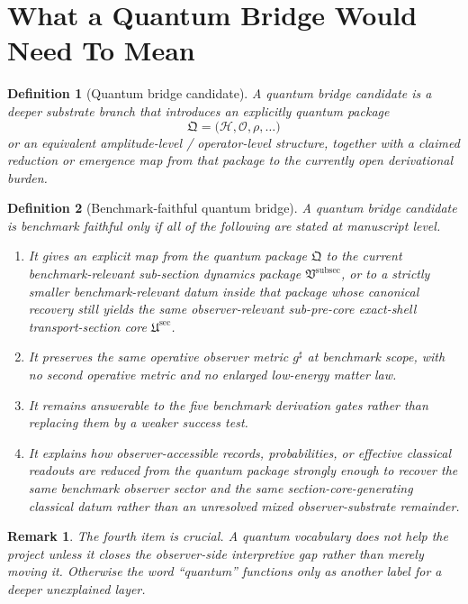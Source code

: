 \documentclass[11pt]{article}
\newcommand{\CompletedMetric}{g^{\sharp}}
\newcommand{\SubPreSectionCore}{\mathfrak U^{\mathrm{sec}}}
\newcommand{\SubSectionPackage}{\mathfrak V^{\mathrm{subsec}}}
\newcommand{\QuantumPackage}{\mathfrak Q}
\newcommand{\HilbertSpaceQ}{\mathcal H}
\newtheorem{definition}{Definition}
\newtheorem{remark}{Remark}
\begin{document}
\section{What a Quantum Bridge Would Need To Mean}

\begin{definition}[Quantum bridge candidate]
A \emph{quantum bridge candidate} is a deeper substrate branch that introduces an explicitly quantum package
\[
\QuantumPackage
=
\bigl(\HilbertSpaceQ,\mathcal O,\rho,\ldots\bigr)
\]
or an equivalent amplitude-level / operator-level structure, together with a claimed reduction or emergence map from that package to the currently open derivational burden.
\end{definition}

\begin{definition}[Benchmark-faithful quantum bridge]
A quantum bridge candidate is \emph{benchmark faithful} only if all of the following are stated at manuscript level.
\begin{enumerate}
    \item It gives an explicit map from the quantum package \(\QuantumPackage\) to the current benchmark-relevant sub-section dynamics package \(\SubSectionPackage\), or to a strictly smaller benchmark-relevant datum inside that package whose canonical recovery still yields the same observer-relevant sub-pre-core exact-shell transport-section core \(\SubPreSectionCore\).
    \item It preserves the same operative observer metric \(\CompletedMetric\) at benchmark scope, with no second operative metric and no enlarged low-energy matter law.
    \item It remains answerable to the five benchmark derivation gates rather than replacing them by a weaker success test.
    \item It explains how observer-accessible records, probabilities, or effective classical readouts are reduced from the quantum package strongly enough to recover the same benchmark observer sector and the same section-core-generating classical datum rather than an unresolved mixed observer-substrate remainder.
\end{enumerate}
\end{definition}

\begin{remark}
The fourth item is crucial. A quantum vocabulary does not help the project unless it closes the observer-side interpretive gap rather than merely moving it. Otherwise the word ``quantum'' functions only as another label for a deeper unexplained layer.
\end{remark}
\end{document}

